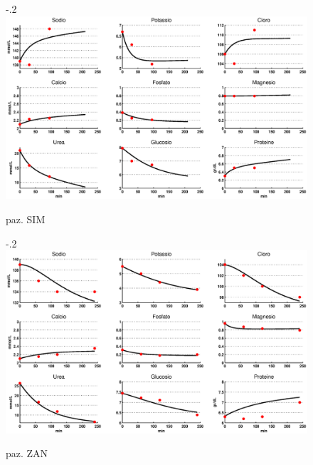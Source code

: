 \begin{figure}[htb]
	\centering
		\advance\leftskip-.2\textwidth
		\includegraphics[width=1.4\textwidth]{immagini/simcal.eps}
		\caption{paz. SIM}		
\end{figure}
\begin{figure}[htb]
	\centering
		\advance\leftskip-.2\textwidth
		\includegraphics[width=1.4\textwidth]{immagini/zancal.eps}
		\caption{paz. ZAN}		
\end{figure}